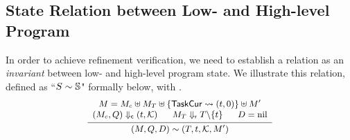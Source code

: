 

\subsection{State Relation between Low- and High-level Program}
\label{subsec:state-rel}
In order to achieve refinement verification, we need to 
establish a relation as an {\it invariant} 
between low- and high-level program state. 
We illustrate this relation, defined as 
``${S} \sim {\mathbb{S}}$" 
formally below, with \Fig{\ref{fig:State Relation between 
Low- and High-level Program State}}.
\[
    \small
    \infer
    {
        \stateRel{(\Mem, \Rstate, \DBuf)}
            {(\thrdpool, \thrdid, \hthrdlocalst, \Mem')}
    }
    {
        \begin{array}{c}
            \Mem = \Mem_c \uplus \Mem_T \uplus 
                \{ \TaskCur \rightsquigarrow (\thrdid, 0) \}
                \uplus \Mem' \\
            \curStRel{(\Mem_c, \Rstate)}{(\thrdid, \hthrdlocalst)}
            \quad \ \ 
            \rdyStRel{\Mem_T}{\thrdpool \backslash \{ \thrdid \}}
            \quad \ \ 
            \DBuf = \nil
        \end{array}
    }
\]

